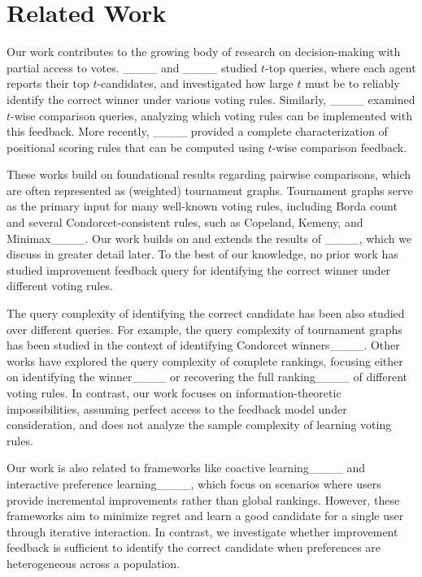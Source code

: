 \section{Related Work}
Our work contributes to the growing body of research on decision-making with partial access to votes.  ____ and ____ studied \(t\)-top queries, where each agent reports their top \(t\)-candidates, and investigated how large \(t\) must be to reliably identify the correct winner under various voting rules. Similarly, ____ examined \(t\)-wise comparison queries, analyzing which voting rules can be implemented with this feedback. More recently, ____ provided a complete characterization of positional scoring rules that can be computed using \(t\)-wise comparison feedback.  

These works build on foundational results regarding pairwise comparisons, which are often represented as (weighted) tournament graphs. Tournament graphs serve as the primary input for many well-known voting rules, including Borda count and several Condorcet-consistent rules, such as Copeland, Kemeny, and Minimax____. Our work builds on and extends the results of ____, which we discuss in greater detail later. To the best of our knowledge, no prior work has studied improvement feedback query for identifying the correct winner under different voting rules. 

The query complexity of identifying the correct candidate has been also studied over different queries. For example, the query complexity of tournament graphs has been studied in the context of identifying Condorcet winners____. Other works have explored the query complexity of complete rankings, focusing either on identifying the winner____ or recovering the full ranking____ of different voting rules. In contrast, our work focuses on information-theoretic impossibilities, assuming perfect access to the feedback model under consideration, and does not analyze the sample complexity of learning voting rules.

Our work is also related to frameworks like coactive learning____ and interactive preference learning____, which focus on scenarios where users provide incremental improvements rather than global rankings. However, these frameworks aim to minimize regret and learn a good candidate for a single user through iterative interaction. In contrast, we investigate whether improvement feedback is sufficient to identify the correct candidate when preferences are heterogeneous across a population.